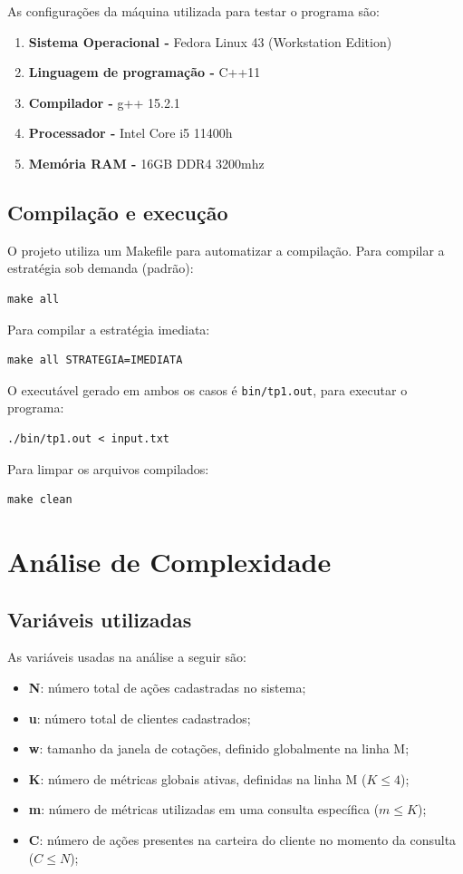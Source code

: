 \documentclass[12pt,a4paper]{article}
\begin{document}
As configurações da máquina utilizada para testar o programa são:
\begin{enumerate}
    \item \textbf{Sistema Operacional -} Fedora Linux 43 (Workstation Edition)
    \item \textbf{Linguagem de programação -} C++11
    \item \textbf{Compilador - }g++ 15.2.1
    \item \textbf{Processador - }Intel Core i5 11400h
    \item \textbf{Memória RAM - }16GB DDR4 3200mhz
\end{enumerate}
\subsection{Compilação e execução}
O projeto utiliza um Makefile para automatizar a compilação. Para compilar a estratégia sob demanda (padrão):
\begin{verbatim}
make all
\end{verbatim}

Para compilar a estratégia imediata:
\begin{verbatim}
make all STRATEGIA=IMEDIATA
\end{verbatim}

O executável gerado em ambos os casos é \texttt{bin/tp1.out}, para executar o programa:
\begin{verbatim}
./bin/tp1.out < input.txt
\end{verbatim}

Para limpar os arquivos compilados:
\begin{verbatim}
make clean
\end{verbatim}

\section{Análise de Complexidade}

\subsection{Variáveis utilizadas}

As variáveis usadas na análise a seguir são:

\begin{itemize}
    \item \textbf{N}: número total de ações cadastradas no sistema;
    \item \textbf{u}: número total de clientes cadastrados;
    \item \textbf{w}: tamanho da janela de cotações, definido globalmente na linha M;
    \item \textbf{K}: número de métricas globais ativas, definidas na linha M ($K \leq 4$);
    \item \textbf{m}: número de métricas utilizadas em uma consulta específica ($m \leq K$);
    \item \textbf{C}: número de ações presentes na carteira do cliente no momento da consulta ($C \leq N$);
\end{itemize}
\end{document}
